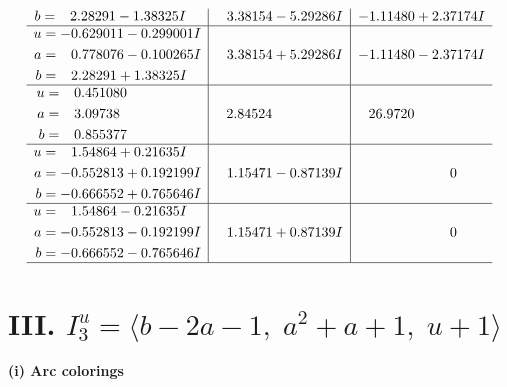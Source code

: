 \documentclass[1p]{elsarticle_modified}
\theoremstyle{definition}
\begin{document}
$$\begin{array}{c|c|c}
\begin{aligned}
b &= \phantom{-}2.28291 - 1.38325 I\end{aligned}
 & \phantom{-}3.38154 - 5.29286 I & -1.11480 + 2.37174 I \\ \hline\begin{aligned}
u &= -0.629011 - 0.299001 I \\
a &= \phantom{-}0.778076 - 0.100265 I \\
b &= \phantom{-}2.28291 + 1.38325 I\end{aligned}
 & \phantom{-}3.38154 + 5.29286 I & -1.11480 - 2.37174 I \\ \hline\begin{aligned}
u &= \phantom{-}0.451080\phantom{ +0.000000I} \\
a &= \phantom{-}3.09738\phantom{ +0.000000I} \\
b &= \phantom{-}0.855377\phantom{ +0.000000I}\end{aligned}
 & \phantom{-}2.84524\phantom{ +0.000000I} & \phantom{-}26.9720\phantom{ +0.000000I} \\ \hline\begin{aligned}
u &= \phantom{-}1.54864 + 0.21635 I \\
a &= -0.552813 + 0.192199 I \\
b &= -0.666552 + 0.765646 I\end{aligned}
 & \phantom{-}1.15471 - 0.87139 I & \phantom{-0.000000 } 0 \\ \hline\begin{aligned}
u &= \phantom{-}1.54864 - 0.21635 I \\
a &= -0.552813 - 0.192199 I \\
b &= -0.666552 - 0.765646 I\end{aligned}
 & \phantom{-}1.15471 + 0.87139 I & \phantom{-0.000000 } 0\\
 \hline 
 \end{array}$$\newpage\newpage\renewcommand{\arraystretch}{1}
\centering \section*{III. $I^u_{3}= \langle b-2 a-1,\;a^2+a+1,\;u+1 \rangle$}
\flushleft \textbf{(i) Arc colorings}\\
\end{document}

